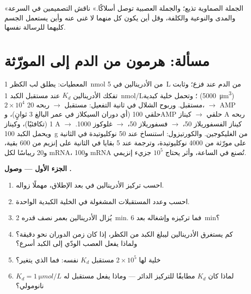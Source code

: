 \begin{exercise}[$\star\star\star$]\label{exo:b2:cell-signalling:12}
«الجملة الصماوية تذيع؛ والجملة العصبية توصل أسلاكًا.»
ناقش التصميمين في السرعة والمدى والنوعية والكلفة، وقل
أين يكون كل منهما لا غنى عنه وأين يستعمل الجسم كليهما
للرسالة نفسها.
\end{exercise}

\section{مسألة: هرمون من الدم إلى المورّثة}

\begin{problem}
\label{pb:b2:cell-signalling:1}
المعطيات: يطلق لب الكظر \qty{1}{nmol} من الأدرينالين في
\qty{5}{L} من الدم عند فزع؛ وثابت تفكك الأدرينالين $K_d$ عند مستقبل
الكبد \qty{1}{nmol/L}؛ وتحمل خلية كبدية (\qty{5000}{\micro m^3})
$2\times 10^{4}$ مستقبل. وربوح الشلال في ثانية
التفعيل: مستقبل $\to$  ربحه 20،  $\to$ AMP حلقي 100
(أي دوران السيكلاز في عمر  البالغ 3 ثوانٍ)،
وAMP حلقي $\to$ كيناز A ربحه 1 (تكافئيًا)، وكيناز A $\to$ كيناز
الفسفوريلاز 50، $\to$ فسفوريلاز 50، $\to$ غلوكوز 1000. ويحمل الكبد
\qty{100}{g} من الغليكوجين. والكورتيزول: استنساخ عند
\qty{50}{} نوكليوتيدة في الثانية على مورّثة من \qty{4000}{}
نوكليوتيدة، وترجمة عند \qty{5}{} بقايا في الثانية على
إنزيم من \num{600} بقية، و\num{20} ريباسًا لكل mRNA، و\num{100}
mRNA تُصنع في الساعة، وأثر يحتاج $10^{5}$ جزيء إنزيمي.

\medskip
\noindent\textbf{الجزء الأول --- وصول .}
\begin{enumerate}
  \item احسب تركيز الأدرينالين في  بعد
        الإطلاق، مهملًا زواله.
  \item احسب  وعدد المستقبلات المشغولة
        في الخلية الكبدية الواحدة.
  \item يُزال الأدرينالين بعمر نصف قدره \qty{2}{min}. فما
        تركيزه وإشغاله بعد \qty{6}{min}؟
  \item كم يستغرق الأدرينالين ليبلغ الكبد من
        الكظر، إذا كان زمن الدوران نحو دقيقة؟ ولماذا
        يفعل العصب الودّي إلى الكبد أسرع؟
  \item خلية لها $2\times 10^{5}$ مستقبل  $K_d$ نفسه:
        فما الذي يتغير؟
  \item لماذا كان $K_d$ مطابقًا للتركيز الدائر ---
        وماذا يفعل مستقبل له $K_d = \qty{1}{\micro mol/L}$
         نانومولي؟
\end{enumerate}


\end{problem}
